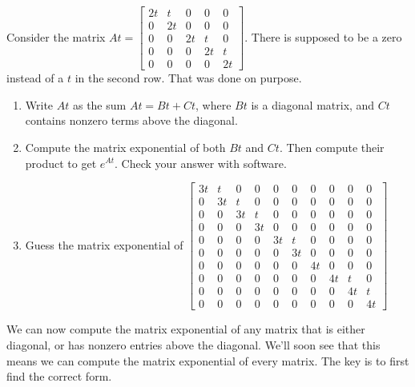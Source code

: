 \begin{problem}
Consider the matrix 
$At = 
\begin{bmatrix}
 2t&t&0&0&0\\
 0&2t&0&0&0\\
 0&0&2t&t&0\\
 0&0&0&2t&t\\
 0&0&0&0&2t
\end{bmatrix}
$. There is supposed to be a zero instead of a $t$ in the second row.  That was done on purpose. 
\begin{enumerate}
 \item Write $At$ as the sum $At=Bt+Ct$, where $Bt$ is a diagonal matrix, and $Ct$ contains nonzero terms above the diagonal. 
 \item Compute the matrix exponential of both $Bt$ and $Ct$. Then compute their product to get $e^{At}$.  Check your answer with software.
 \item {}%
Guess the matrix exponential of 
$
\begin{bmatrix}
 3t& t& 0& 0& 0& 0& 0& 0& 0& 0 \\
 0 &3t& t& 0& 0& 0& 0& 0& 0& 0 \\
 0 & 0&3t& t& 0& 0& 0& 0& 0& 0 \\
 0 & 0& 0&3t& 0& 0& 0& 0& 0& 0 \\
 0 & 0& 0& 0&3t& t& 0& 0& 0& 0 \\
 0 & 0& 0& 0& 0&3t& 0& 0& 0& 0 \\
 0 & 0& 0& 0& 0& 0&4t& 0& 0& 0 \\
 0 & 0& 0& 0& 0& 0& 0&4t& t& 0 \\
 0 & 0& 0& 0& 0& 0& 0& 0&4t& t \\
 0 & 0& 0& 0& 0& 0& 0& 0& 0&4t  
\end{bmatrix}
$
\end{enumerate}

\end{problem}




We can now compute the matrix exponential of any matrix that is either diagonal, or has nonzero entries above the diagonal.  We'll soon see that this means we can compute the matrix exponential of every matrix.  The key is to first find the correct form.

